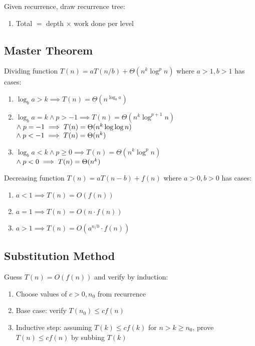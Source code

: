 \documentclass[12pt, a4paper]{article}
\begin{document}
\begin{multicols*}{3}
Given recurrence, draw recurrence tree:
\begin{enumerate}[\roman*.]
  \item Total $=$ depth $\times$ work done per level
\end{enumerate}


\colbreak

\subsection{Master Theorem}

Dividing function $T(n) = aT(n/b) + \Theta(n^k\log^pn)$ where $a>1, b>1$ has cases:
\begin{enumerate}[\roman*.]
  \item $\log_ba > k \implies T(n)=\Theta(n^{\log_ba})$
  \item $\log_ba = k \land p>-1 \implies T(n) = \Theta(n^k\log^{p+1}n)$\\
    \hspace{4.5em}$\land\hspace{0.25em}p=-1 \implies T(n) = \Theta(n^k\log\log n)$\\
    \hspace{4.5em}$\land\hspace{0.25em}p<-1 \implies T(n) = \Theta(n^k)$
  \item $\log_ba < k \land p \geq 0 \implies T(n) = \Theta(n^k\log^pn)$\\
    \hspace{4.5em}$\land\hspace{0.25em}p<0 \implies T(n) = \Theta(n^k)$
\end{enumerate}

Decreasing function $T(n) = aT(n-b) + f(n)$ where $a>0, b>0$ has cases:
\begin{enumerate}[\roman*.]
  \item $a < 1 \implies T(n)=O(f(n))$
  \item $a = 1 \implies T(n) = O(n\cdot f(n))$
  \item $a > 1 \implies T(n) = O(a^{n/b}\cdot f(n))$
\end{enumerate}



\subsection{Substitution Method}

Guess $T(n) = O(f(n))$ and verify by induction:
\begin{enumerate}[\roman*.]
  \item Choose values of $c > 0, n_0$ from recurrence
  \item Base case: verify $T(n_0) \leq cf(n)$
  \item Inductive step: assuming $T(k) \leq cf(k)$ for $n > k \geq n_0$, prove $T(n) \leq cf(n)$ by subbing $T(k)$
\end{enumerate}


\end{multicols*}
\end{document}

